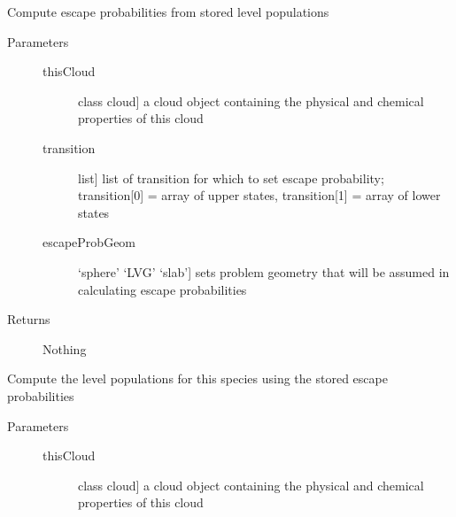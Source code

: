 \documentclass[letterpaper,10pt,english]{sphinxmanual}
\begin{document}
\begin{fulllineitems}
\begin{fulllineitems}
\end{fulllineitems}


\begin{fulllineitems}
\label{fulldoc:despotic.emitter.setEscapeProb}
Compute escape probabilities from stored level populations
\begin{description}
\item[{Parameters}] \leavevmode\begin{description}
\item[{thisCloud}] \leavevmode{[}class cloud{]}
a cloud object containing the physical and chemical
properties of this cloud

\item[{transition}] \leavevmode{[}list{]}
list of transition for which to set escape probability;
transition{[}0{]} = array of upper states, transition{[}1{]} =
array of lower states

\item[{escapeProbGeom}] \leavevmode{[}`sphere' \textbar{} `LVG' \textbar{} `slab'{]}
sets problem geometry that will be assumed in calculating
escape probabilities

\end{description}

\item[{Returns}] \leavevmode
Nothing

\end{description}

\end{fulllineitems}


\begin{fulllineitems}
\label{fulldoc:despotic.emitter.setLevPop}
Compute the level populations for this species using the
stored escape probabilities
\begin{description}
\item[{Parameters}] \leavevmode\begin{description}
\item[{thisCloud}] \leavevmode{[}class cloud{]}
a cloud object containing the physical and chemical
properties of this cloud


\end{description}
\end{description}
\end{fulllineitems}
\end{fulllineitems}
\end{document}

